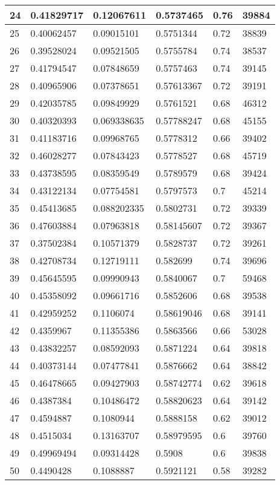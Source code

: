 \begin{longtable}{|l|l|l|l|l|l|}
24 & 0.41829717 & 0.12067611 & 0.5737465 & 0.76 & 39884 \\ \hline 
25 & 0.40062457 & 0.09015101 & 0.5751344 & 0.72 & 38839 \\ \hline 
26 & 0.39528024 & 0.09521505 & 0.5755784 & 0.74 & 38537 \\ \hline 
27 & 0.41794547 & 0.07848659 & 0.5757463 & 0.74 & 39145 \\ \hline 
28 & 0.40965906 & 0.07378651 & 0.57613367 & 0.72 & 39191 \\ \hline 
29 & 0.42035785 & 0.09849929 & 0.5761521 & 0.68 & 46312 \\ \hline 
30 & 0.40320393 & 0.069338635 & 0.57788247 & 0.68 & 45155 \\ \hline 
31 & 0.41183716 & 0.09968765 & 0.5778312 & 0.66 & 39402 \\ \hline 
32 & 0.46028277 & 0.07843423 & 0.5778527 & 0.68 & 45719 \\ \hline 
33 & 0.43738595 & 0.08359549 & 0.5789579 & 0.68 & 39424 \\ \hline 
34 & 0.43122134 & 0.07754581 & 0.5797573 & 0.7 & 45214 \\ \hline 
35 & 0.45413685 & 0.088202335 & 0.5802731 & 0.72 & 39339 \\ \hline 
36 & 0.47603884 & 0.07963818 & 0.58145607 & 0.72 & 39367 \\ \hline 
37 & 0.37502384 & 0.10571379 & 0.5828737 & 0.72 & 39261 \\ \hline 
38 & 0.42708734 & 0.12719111 & 0.582699 & 0.74 & 39696 \\ \hline 
39 & 0.45645595 & 0.09990943 & 0.5840067 & 0.7 & 59468 \\ \hline 
40 & 0.45358092 & 0.09661716 & 0.5852606 & 0.68 & 39538 \\ \hline 
41 & 0.42959252 & 0.1106074 & 0.58619046 & 0.68 & 39141 \\ \hline 
42 & 0.4359967 & 0.11355386 & 0.5863566 & 0.66 & 53028 \\ \hline 
43 & 0.43832257 & 0.08592093 & 0.5871224 & 0.64 & 39818 \\ \hline 
44 & 0.40373144 & 0.07477841 & 0.5876662 & 0.64 & 38842 \\ \hline 
45 & 0.46478665 & 0.09427903 & 0.58742774 & 0.62 & 39618 \\ \hline 
46 & 0.4387384 & 0.10486472 & 0.58820623 & 0.64 & 39142 \\ \hline 
47 & 0.4594887 & 0.1080944 & 0.5888158 & 0.62 & 39012 \\ \hline 
48 & 0.4515034 & 0.13163707 & 0.58979595 & 0.6 & 39760 \\ \hline 
49 & 0.49969494 & 0.09314428 & 0.5908 & 0.6 & 39838 \\ \hline 
50 & 0.4490428 & 0.1088887 & 0.5921121 & 0.58 & 39282 \\ \hline 
\end{longtable}